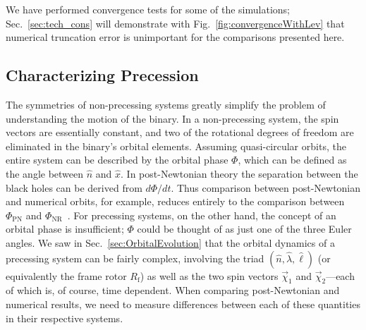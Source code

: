 \documentclass[aps,prd,amsmath,floatfix,twocolumn,superscriptaddress,nofootinbib,showpacs]{revtex4-1}
\newcommand{\ellHat}{\ensuremath{\hat{\ell}}}
\newcommand{\nHat}{\ensuremath{\hat{n}}}
\newcommand{\lambdaHat}{\ensuremath{\hat{\lambda}}}
\newcommand{\Rf}[1][]{\ensuremath{R_{\text{f#1}}}}
\begin{document}
We have performed convergence tests for some of the simulations;
Sec.~\ref{sec:tech_cons} will demonstrate with
Fig.~\ref{fig:convergenceWithLev} that numerical truncation error is
unimportant for the comparisons presented here.


\subsection{Characterizing Precession}
\label{CharacterizingPrecessionByRotors}


The symmetries of non-precessing systems greatly simplify the problem
of understanding the motion of the binary.  In a non-precessing
system, the spin vectors are essentially constant, and two of the
rotational degrees of freedom are eliminated in the binary's orbital
elements.  Assuming quasi-circular orbits, the entire system can be
described by the orbital phase $\Phi$, which can be defined as the
angle between $\nHat$ and $\hat{x}$.  In post-Newtonian theory the
separation between the black holes can be derived from $d\Phi/dt$.
Thus comparison between post-Newtonian and numerical orbits, for
example, reduces entirely to the comparison between $\Phi_{\text{PN}}$
and $\Phi_{\text{NR}}$~\cite{Buonanno-Cook-Pretorius:2007, Boyle2007}.
For precessing systems, on the other hand, the concept of an orbital
phase is insufficient; $\Phi$ could be thought of as just one of
the three Euler angles.  We saw in Sec.~\ref{sec:OrbitalEvolution}
that the orbital dynamics of a precessing system can be fairly
complex, involving the triad $(\nHat, \lambdaHat, \ellHat)$ (or
equivalently the frame rotor $\Rf$) as well as the two spin vectors
$\vec{\chi}_{1}$ and $\vec{\chi}_{2}$---each of which is, of course,
time dependent.  When comparing post-Newtonian and numerical results,
we need to measure differences between each of these quantities in
their respective systems.
\end{document}
